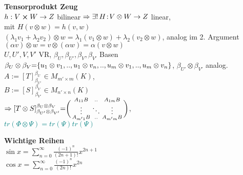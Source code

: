 \documentclass[8pt, a4paper, landscape]{extarticle}
\newcommand{\tit}[1]{\textbf{#1} \\}
\newcommand{\eq}{\negthickspace=\negthickspace}
\newcommand{\green}[1]{\textcolor{teal}{#1}}
\begin{document}
\begin{multicols*}{5}
\begin{ibox}
    \tit{Tensorprodukt Zeug}
        \textbullet $h: V \cross W \rightarrow Z$ bilinear$\\
    \Rightarrow \exists!\,H\negthinspace:\negthinspace V \otimes W \rightarrow Z$ linear, \\
    mit $H(v \otimes w) = h(v,w)$ \\
        \textbullet $(\lambda_1v_1+\lambda_2v_2)\otimes w = \lambda_1(v_1\otimes w) + \lambda_2(v_2\otimes w)$, analog im 2. Argument\\
    \textbullet $(\alpha v)\otimes w=v\otimes(\alpha w) = \alpha(v\otimes w)$\\
    \textbullet $U,U',V,V'$ VR, $\beta_U, \beta_{U'}, \beta_V, \beta_{V'}$ Basen\\$\beta_U\otimes\beta_V\eq\{u_1\otimes v_1,..,u_1\otimes v_n,..,u_m\otimes v_1,.., u_m\otimes v_n\}$, $\beta_{U'}\otimes\beta_{V'}$ analog.\\
    $A:= [T]_{\beta_{U'}}^{\beta_U}\in M_{m'\times m}(K)$, \\ $B:=[S]_{\beta_{V'}}^{\beta_V}\in M_{n'\times n}(K)$
    \\
    $
    \Rightarrow [T\otimes S]_{\beta_{U'}\otimes\beta_{V'}}^{\beta_{U}\otimes\beta_{V}} \eq
    \bigg(\begin{smallmatrix}
        A_{11}B & .. & A_{1m}B \\
        \vdots & \ddots & \vdots \\
        A_{m'1}B & .. & A_{m'm}B \\
    \end{smallmatrix}\bigg)
    $, 
    \\
    \textbullet \green{$tr(\Phi\otimes\Psi)=tr(\Psi)tr(\Psi)$}\\

        
\end{ibox}


\begin{ibox}
\tit{Wichtige Reihen}
$\sin{x} = \sum_{n=0}^{\infty} \frac{(-1)^n}{(2 n+1) !} x^{2 n+1}$\\
$\cos{x} = \sum_{n=0}^{\infty} \frac{(-1)^n}{(2 n) !} x^{2 n}$
\end{ibox}


\end{multicols*}
\end{document}
